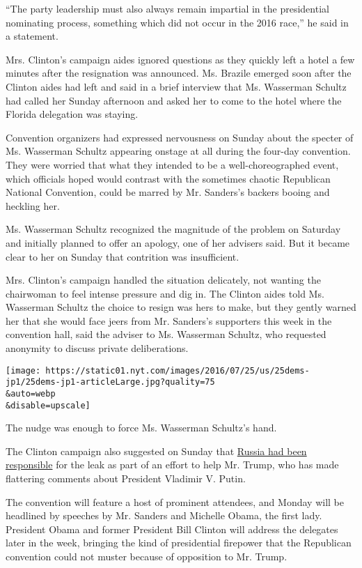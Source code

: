 ``The party leadership must also always remain impartial in the
presidential nominating process, something which did not occur in the
2016 race,'' he said in a statement.

Mrs. Clinton's campaign aides ignored questions as they quickly left a
hotel a few minutes after the resignation was announced. Ms. Brazile
emerged soon after the Clinton aides had left and said in a brief
interview that Ms. Wasserman Schultz had called her Sunday afternoon and
asked her to come to the hotel where the Florida delegation was staying.

Convention organizers had expressed nervousness on Sunday about the
specter of Ms. Wasserman Schultz appearing onstage at all during the
four-day convention. They were worried that what they intended to be a
well-choreographed event, which officials hoped would contrast with the
sometimes chaotic Republican National Convention, could be marred by Mr.
Sanders's backers booing and heckling her.

Ms. Wasserman Schultz recognized the magnitude of the problem on
Saturday and initially planned to offer an apology, one of her advisers
said. But it became clear to her on Sunday that contrition was
insufficient.

Mrs. Clinton's campaign handled the situation delicately, not wanting
the chairwoman to feel intense pressure and dig in. The Clinton aides
told Ms. Wasserman Schultz the choice to resign was hers to make, but
they gently warned her that she would face jeers from Mr. Sanders's
supporters this week in the convention hall, said the adviser to Ms.
Wasserman Schultz, who requested anonymity to discuss private
deliberations.

\texttt{[image: https://static01.nyt.com/images/2016/07/25/us/25dems-jp1/25dems-jp1-articleLarge.jpg?quality=75\\\&auto=webp\\\&disable=upscale]}

The nudge was enough to force Ms. Wasserman Schultz's hand.

The Clinton campaign also suggested on Sunday that
\href{http://www.nytimes.com/2016/07/25/us/politics/donald-trump-russia-emails.html}{Russia
had been responsible} for the leak as part of an effort to help Mr.
Trump, who has made flattering comments about President Vladimir V.
Putin.

The convention will feature a host of prominent attendees, and Monday
will be headlined by speeches by Mr. Sanders and Michelle Obama, the
first lady. President Obama and former President Bill Clinton will
address the delegates later in the week, bringing the kind of
presidential firepower that the Republican convention could not muster
because of opposition to Mr. Trump.

